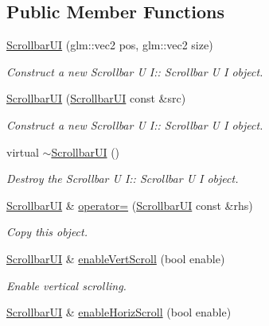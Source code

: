 \subsection*{Public Member Functions}
\begin{DoxyCompactItemize}
\item 
\hyperlink{class_scrollbar_u_i_ab140070030647953a0624b2a55be54b1}{Scrollbar\+UI} (glm\+::vec2 pos, glm\+::vec2 size)
\begin{DoxyCompactList}\small\item\em Construct a new Scrollbar U I\+:\+: Scrollbar U I object. \end{DoxyCompactList}\item 
\hyperlink{class_scrollbar_u_i_a5fd6496ba9ec34d5e2e5e86dd18d49fd}{Scrollbar\+UI} (\hyperlink{class_scrollbar_u_i}{Scrollbar\+UI} const \&src)
\begin{DoxyCompactList}\small\item\em Construct a new Scrollbar U I\+:\+: Scrollbar U I object. \end{DoxyCompactList}\item 
\mbox{\label{class_scrollbar_u_i_ace26f283dec7ca0777949924ed782326}} 
virtual \hyperlink{class_scrollbar_u_i_ace26f283dec7ca0777949924ed782326}{$\sim$\+Scrollbar\+UI} ()
\begin{DoxyCompactList}\small\item\em Destroy the Scrollbar U I\+:\+: Scrollbar U I object. \end{DoxyCompactList}\item 
\hyperlink{class_scrollbar_u_i}{Scrollbar\+UI} \& \hyperlink{class_scrollbar_u_i_a9cff2b43b275058afa3f3ba242c42e41}{operator=} (\hyperlink{class_scrollbar_u_i}{Scrollbar\+UI} const \&rhs)
\begin{DoxyCompactList}\small\item\em Copy this object. \end{DoxyCompactList}\item 
\hyperlink{class_scrollbar_u_i}{Scrollbar\+UI} \& \hyperlink{class_scrollbar_u_i_a3e782056929dbee685c09abfdbcf6473}{enable\+Vert\+Scroll} (bool enable)
\begin{DoxyCompactList}\small\item\em Enable vertical scrolling. \end{DoxyCompactList}\item 
\hyperlink{class_scrollbar_u_i}{Scrollbar\+UI} \& \hyperlink{class_scrollbar_u_i_aa7e2e95bfbbc527f72b7576601d08944}{enable\+Horiz\+Scroll} (bool enable)

\end{DoxyCompactItemize}
